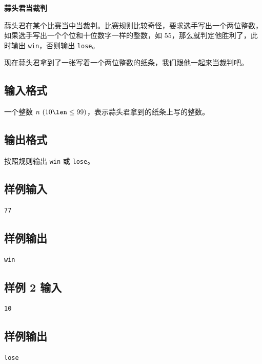 \documentclass{article}
\newcommand{\problemname}[1]{\begin{center}\Large\bfseries #1\end{center}}
\begin{document}
\problemname{蒜头君当裁判}

蒜头君在某个比赛当中当裁判。比赛规则比较奇怪，要求选手写出一个两位整数，如果选手写出一个个位和十位数字一样的整数，如 $55$，那么就判定他胜利了，此时输出 \texttt{win}，否则输出 \texttt{lose}。

现在蒜头君拿到了一张写着一个两位整数的纸条，我们跟他一起来当裁判吧。

\subsection*{输入格式}
一个整数 $n\text{ }(10\len\le99)$，表示蒜头君拿到的纸条上写的整数。

\subsection*{输出格式}
按照规则输出 \texttt{win} 或 \texttt{lose}。

\subsection*{样例输入}
\begin{verbatim}
77
\end{verbatim}

\subsection*{样例输出}
\begin{verbatim}
win
\end{verbatim}

\subsection*{样例 2 输入}
\begin{verbatim}
10
\end{verbatim}

\subsection*{样例输出}
\begin{verbatim}
lose
\end{verbatim}
\end{document}
